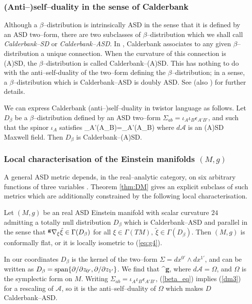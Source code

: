\subsubsection{(Anti--)self--duality in the sense of Calderbank}
Although a $\beta$--distribution is intrinsically ASD in the sense that it is defined by an ASD two--form, there are two subclasses of $\beta$--distribution which we shall call \textit{Calderbank--SD} or \textit{Calderbank--ASD}. In \cite{Cal1}, Calderbank associates to any given $\beta$--distribution a unique connection. When the curvature of this connection is (A)SD, the $\beta$--distribution is called Calderbank--(A)SD. This has nothing to do with the anti--self-duality of the two--form defining the $\beta$--distribution; in a sense, a $\beta$--distribution which is Calderbank--ASD is doubly ASD. See \cite{Cal1} (also \cite{West}) for further details.

We can express Calderbank (anti--)self--duality in twistor language as follows. Let $D_\beta$ be a $\beta$--distribution defined by an ASD two--form $\Sigma_{ab}=\iota_A\iota_B\epsilon_{A'B'}$, and  such that the spinor $\iota_A$ satisfies
\be
\label{dm3}
\nabla_{A'(A}\iota_{B)}=_{A'(A}\iota_{B)}
\ee
where $d\mathcal{A}$ is an (A)SD Maxwell field. Then $D_\beta$ is Calderbank--(A)SD.

 
\subsubsection{Local characterisation of the Einstein manifolds $(M,g)$}

A general ASD metric depends, in the real--analytic category, on six arbitrary functions of three variables \cite{DFK}. Theorem \ref{thm:DM} gives an explicit subclass of such metrics which are additionally constrained by the following local characterisation.

\begin{theo}[\cite{DM}] \label{thm:DMcharacterisation}
Let $(M,g)$ be an real ASD Einstein manifold with scalar curvature $24$ admitting a totally null distribution $D_\beta$ which is Calderbank--ASD and parallel in the sense that $^{\bf g}\nabla_{\xi} \tilde{\xi}\in\Gamma(D_\beta)$ for all $\xi\in \Gamma(TM),\ \tilde{\xi}\in\Gamma(D_\beta)$. Then $(M,g)$ is conformally flat, or it is locally isometric to (\ref{eq:g4}).
\end{theo}
\noindent

In our coordinates $D_\beta$ is the kernel of the two--form $\Sigma=dx^{0'}\wedge dx^{1'}$, and can be written as ${D_\beta}=\mathrm{span}\{\partial/\partial z_{0'},\partial/\partial z_{1'}\}$. We find that
\be
\label{beta_eq}
^{\bf g}\nabla{}\otimes \Sigma,
\ee
where $d\mathcal{A}=\Omega$, and $\Omega$ is the symplectic form on $M$. Writing $\Sigma_{ab}=\iota_A\iota_B\epsilon_{A'B'}$, (\ref{beta_eq}) implies (\ref{dm3}) for a rescaling of $\mathcal{A}$, so it is the anti--self--duality of $\Omega$ which makes $D$ Calderbank--ASD.

